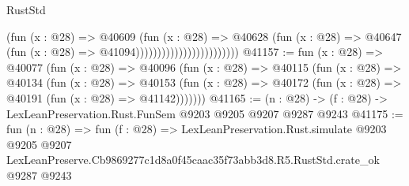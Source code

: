 \begin{lexlean}{RustStd}
\begin{coremodule}
                                            (fun (x : @28) =>
                                            @40609
                                              (fun (x : @28) =>
                                              @40628
                                                (fun (x : @28) =>
                                                @40647
                                                  (fun (x : @28) => @41094))))))))))))))))))))))))
@41157 := fun (x : @28) =>
  @40077
    (fun (x : @28) =>
    @40096
      (fun (x : @28) =>
      @40115
        (fun (x : @28) =>
        @40134
          (fun (x : @28) =>
          @40153 (fun (x : @28) => @40172 (fun (x : @28) => @40191 (fun (x : @28) => @41142)))))))
@41165 := (n : @28) -> (f : @28) -> LexLeanPreservation.Rust.FunSem @9203 @9205 @9207 @9287 @9243
@41175 := fun (n : @28) =>
  fun (f : @28) =>
  LexLeanPreservation.Rust.simulate
    @9203
    @9205
    @9207
    LexLeanPreserve.Cb9869277c1d8a0f45caac35f73abb3d8.R5.RustStd.crate_ok
    @9287
    @9243
\end{coremodule}
\end{lexlean}
